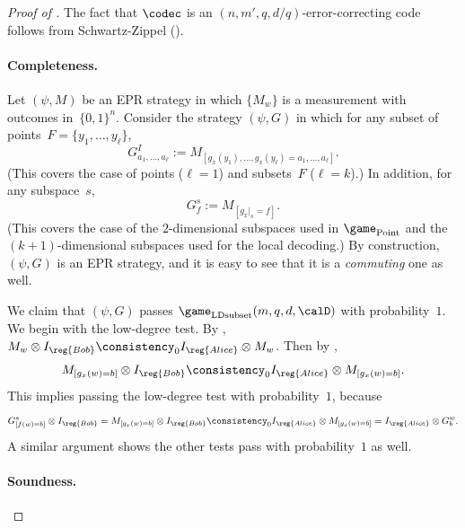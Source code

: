 \begin{proof}[Proof of ]
The fact that $\codec$ is an $(n, m', q, d/q)$-error-correcting code follows from Schwartz-Zippel ().

\paragraph{Completeness.}
Let $(\psi, M)$ be an EPR strategy in which $\{M_w\}$ is a measurement with outcomes in~$\{0, 1\}^n$.
Consider the strategy $(\psi, G)$ in which for any subset of points~$F = \{y_1, \ldots, y_\ell\}$,
\begin{equation*}
	G^I_{a_1, \ldots, a_\ell} := M_{[g_x(y_1), \ldots, g_x(y_\ell) = a_1, \ldots, a_\ell]}.
\end{equation*}
(This covers the case of points ($\ell = 1$) and subsets~$F$ ($\ell = k$).)
In addition, for any subspace~$s$,
\begin{equation*}
	G^s_{f} := M_{[g_x|_s = f]}.
\end{equation*}
(This covers the case of the $2$-dimensional subspaces used in $\game_{\mathrm{Point}}$
and the $(k+1)$-dimensional subspaces used for the local decoding.)
By construction, $(\psi, G)$ is an EPR strategy,
and it is easy to see that it is a \emph{commuting} one as well.

We claim that $(\psi, G)$ passes $\game_{\mathrm{LDsubset}}(m, q, d, \calD)$ with probability~$1$.
We begin with the low-degree test.
By ,
$M_w \otimes I_{\reg{Bob}} \consistency_0 I_{\reg{Alice}} \otimes M_w$.
Then by ,
\begin{equation*}
M_{[g_x(w) = b]} \otimes I_{\reg{Bob}}
\consistency_{0} I_{\reg{Alice}} \otimes M_{[g_x(w) = b]}.
\end{equation*}
This implies passing the low-degree test with probability~$1$, because
\begin{equation*}
G^s_{[f(w) = b]} \otimes I_{\reg{Bob}}
= M_{[g_x(w) = b]} \otimes I_{\reg{Bob}}
\consistency_{0} I_{\reg{Alice}} \otimes M_{[g_x(w) = b]} = I_{\reg{Alice}} \otimes G^w_b.
\end{equation*}
A similar argument shows the other tests pass with probability~$1$ as well.

\paragraph{Soundness.}


\end{proof}
